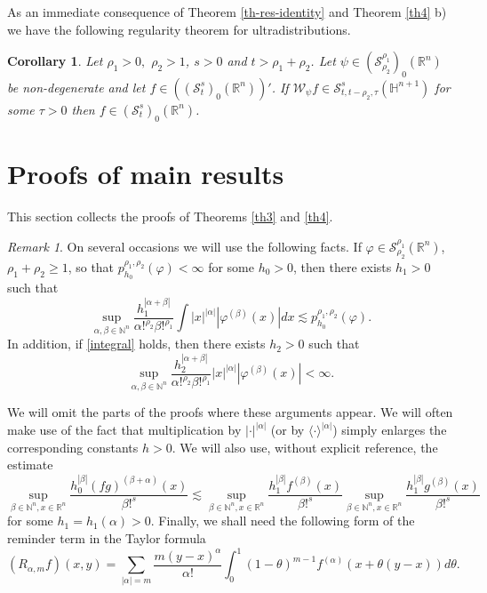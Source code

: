 \documentclass[reqno,12pt]{amsart}
\theoremstyle{plain}
\newtheorem{corollary}{Corollary}
\theoremstyle{definition}
\theoremstyle{remark}
\newtheorem{remark}{Remark}
\begin{document}
\par

As an immediate consequence of Theorem \ref{th-res-identity} and
Theorem \ref{th4} b) we have the following regularity theorem for ultradistributions.

\begin{corollary} Let  $ \rho_1 > 0,$ $ \rho_2 > 1 $, $s > 0$ and $ t > \rho_1 + \rho_2 $.
Let $\psi \in  (\mathcal{S}_{\rho_2}^{\rho_1})_0 (\mathbb{R}^n) $ be non-degenerate
and let $f \in (({\mathcal S}^s _{t})_0 (\mathbb{R}^n))'$.
If $ \mathcal{W}_{\psi} f \in
\mathcal{ S}^s _{t, t-\rho_2, \tau} (\mathbb{H}^{n+1})$ for some $
\tau > 0$ then $ f \in ({\mathcal S}^s_{t})_{0} (\mathbb{R}^n) $.
\end{corollary}

\section{Proofs of main results} \label{Sec3}

This section collects the proofs of  Theorems \ref{th3} and
\ref{th4}.

\begin{remark} \label{enlarge h}
On several occasions we will use the following facts. If $ \varphi
\in \mathcal{S}_{{\rho_2}} ^{{\rho_1}} (\mathbb{R}^n) $, $ {\rho_1} + {\rho_2} \geq 1$,
so that $ p^{{\rho_1}, {\rho_2}} _{h_0} (\varphi) < \infty$ for some $h_0 >0$,
then there exists $h_1>0$ such that
\begin{equation} \label{integral}
\sup_{\alpha, \beta \in \mathbb{N} ^n} \frac{ h_1 ^{|\alpha +
\beta|} }{ \alpha !^{\rho_2} \beta !^{\rho_1}} \int | x |^{|\alpha|} |\varphi
^{(\beta)} (x)| dx \lesssim p^{{\rho_1}, {\rho_2}} _{h_0} (\varphi).
\end{equation}
In addition, if  \eqref{integral} holds, then there exists $h_2>0$ such
that
$$
\sup_{\alpha, \beta \in \mathbb{N} ^n} \frac{ h_2 ^{|\alpha +
\beta|} }{ \alpha!^{\rho_2} \beta!^{\rho_1}}
 | x |^{|\alpha|} | \varphi ^{(\beta)} (x) | < \infty.
$$

We will omit the parts of the proofs where these arguments
appear. We will often make use of the fact that multiplication by $
|\cdot |^{|\alpha|} $ (or by $\langle \cdot \rangle^{|\alpha|} $)
simply enlarges the corresponding constants $h>0$.
We will also use, without explicit reference, the estimate
$$
\sup_{\beta \in \mathbb{N}^n, x \in \mathbb{R}^n} \frac{h_0
^{|\beta|} (fg)^{(\beta + \alpha)}(x)}{\beta!^s } \lesssim
\sup_{\beta\in \mathbb{N}^n, x \in \mathbb{R}^n } \frac{h_1
^{|\beta|} f^{(\beta)}(x)}{\beta!^s } \sup_{\beta\in \mathbb{N}^n, x
\in \mathbb{R}^n } \frac{h_1 ^{|\beta|} g^{(\beta)} (x)}{\beta!^s }
$$
for some $ h_1 = h_1 (\alpha) > 0 $. Finally, we shall need the following form of the reminder term in the Taylor formula
$$
(R_{\alpha,m} f)(x,y) =  \sum_{|\alpha| = m}
\frac{m(y-x)^{\alpha}}{\alpha!} \int_0 ^1 (1-\theta)^{m-1}
 f^{(\alpha)} (x + \theta(y-x))d\theta.
$$
\end{remark}
\end{document}
